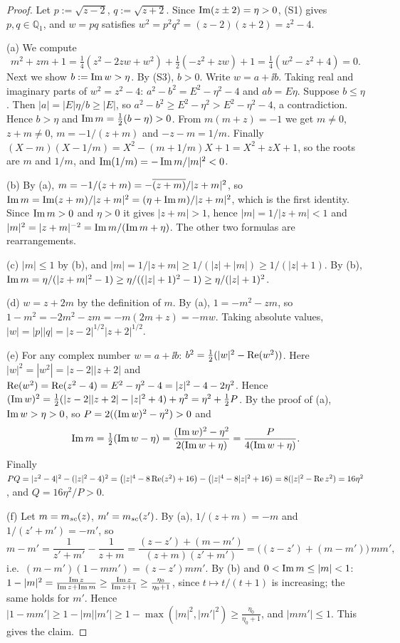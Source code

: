 \begin{proof}
Let $p:=\sqrt{z-2}$, $q:=\sqrt{z+2}$. Since $\operatorname{Im}(z\pm2)=\eta>0$, (S1) gives $p,q\in\mathbb Q_1$, and $w=pq$ satisfies $w^2=p^2q^2=(z-2)(z+2)=z^2-4$.

(a) We compute
\[
 m^2+zm+1=\tfrac14(z^2-2zw+w^2)+\tfrac12(-z^2+zw)+1=\tfrac14(w^2-z^2+4)=0 .
\]
Next we show $b:=\operatorname{Im} w>\eta$. By (S3), $b>0$. Write $w=a+\ii b$. Taking real and imaginary parts of $w^2=z^2-4$: $a^2-b^2=E^2-\eta^2-4$ and $ab=E\eta$.
Suppose $b\le\eta$. Then $|a|=|E|\eta/b\ge|E|$, so $a^2-b^2\ge E^2-\eta^2>E^2-\eta^2-4$, a contradiction. Hence $b>\eta$ and $\operatorname{Im} m=\frac12(b-\eta)>0$.
From $m(m+z)=-1$ we get $m\ne0$, $z+m\ne0$, $m=-1/(z+m)$ and $-z-m=1/m$. Finally $(X-m)(X-1/m)=X^2-(m+1/m)X+1=X^2+zX+1$, so the roots are $m$ and $1/m$, and
$\operatorname{Im}(1/m)=-\operatorname{Im} m/|m|^2<0$.

(b) By (a), $m=-1/(z+m)=-\overline{(z+m)}/|z+m|^2$, so $\operatorname{Im} m=\operatorname{Im}(z+m)/|z+m|^2=(\eta+\operatorname{Im} m)/|z+m|^2$, which is the first identity. Since $\operatorname{Im} m>0$ and $\eta>0$ it gives $|z+m|>1$, hence
$|m|=1/|z+m|<1$ and $|m|^2=|z+m|^{-2}=\operatorname{Im} m/(\operatorname{Im} m+\eta)$. The other two formulas are rearrangements.

(c) $|m|\le1$ by (b), and $|m|=1/|z+m|\ge1/(|z|+|m|)\ge1/(|z|+1)$. By (b), $\operatorname{Im} m=\eta/(|z+m|^2-1)\ge\eta/((|z|+1)^2-1)\ge\eta/(|z|+1)^2$.

(d) $w=z+2m$ by the definition of $m$. By (a), $1=-m^2-zm$, so $1-m^2=-2m^2-zm=-m(2m+z)=-mw$. Taking absolute values, $|w|=|p||q|=|z-2|^{1/2}|z+2|^{1/2}$.

(e) For any complex number $w=a+\ii b$: $b^2=\frac12(|w|^2-\operatorname{Re}(w^2))$. Here $|w|^2=|w^2|=|z-2||z+2|$ and $\operatorname{Re}(w^2)=\operatorname{Re}(z^2-4)=E^2-\eta^2-4=|z|^2-4-2\eta^2$. Hence
$(\operatorname{Im} w)^2=\frac12(|z-2||z+2|-|z|^2+4)+\eta^2=\eta^2+\frac12P$. By the proof of (a), $\operatorname{Im} w>\eta>0$, so $P=2((\operatorname{Im} w)^2-\eta^2)>0$ and
\[
 \operatorname{Im} m=\tfrac12(\operatorname{Im} w-\eta)=\frac{(\operatorname{Im} w)^2-\eta^2}{2(\operatorname{Im} w+\eta)}=\frac{P}{4(\operatorname{Im} w+\eta)} .
\]
Finally $PQ=|z^2-4|^2-(|z|^2-4)^2=\big(|z|^4-8\operatorname{Re}(z^2)+16\big)-\big(|z|^4-8|z|^2+16\big)=8(|z|^2-\operatorname{Re} z^2)=16\eta^2$, and $Q=16\eta^2/P>0$.

(f) Let $m=m_{sc}(z)$, $m'=m_{sc}(z')$. By (a), $1/(z+m)=-m$ and $1/(z'+m')=-m'$, so
\[
 m-m'=\frac1{z'+m'}-\frac1{z+m}=\frac{(z-z')+(m-m')}{(z+m)(z'+m')}=\big((z-z')+(m-m')\big)\,mm',
\]
i.e.\ $(m-m')(1-mm')=(z-z')mm'$. By (b) and $0<\operatorname{Im} m\le|m|<1$: $1-|m|^2=\frac{\operatorname{Im} z}{\operatorname{Im} z+\operatorname{Im} m}\ge\frac{\operatorname{Im} z}{\operatorname{Im} z+1}\ge\frac{\eta_0}{\eta_0+1}$, since $t\mapsto t/(t+1)$ is increasing; the same holds for $m'$.
Hence $|1-mm'|\ge1-|m||m'|\ge1-\max(|m|^2,|m'|^2)\ge\frac{\eta_0}{\eta_0+1}$, and $|mm'|\le1$. This gives the claim.


\end{proof}
